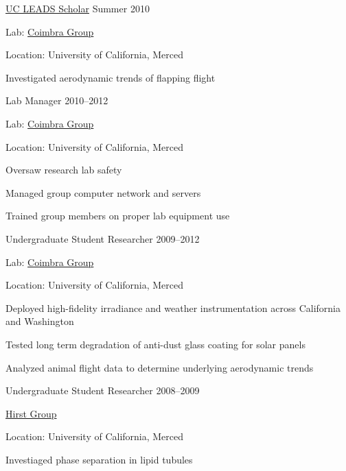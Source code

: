 \documentclass[11pt]{article}
\newcommand{\blankline}{\quad\pagebreak[3]}
\begin{document}
\blankline


\href{http://graduatedivision.ucmerced.edu/grad-prep-programs/uc-leads}{UC LEADS Scholar} \hfill Summer 2010
\begin{innerlist}
    \item Lab: \href{http://coimbra.ucsd.edu/}{Coimbra Group}
    \item Location: University of California, Merced
    \item Investigated aerodynamic trends of flapping flight
\end{innerlist}


\blankline


Lab Manager \hfill 2010--2012
\begin{innerlist}
    \item Lab: \href{http://coimbra.ucsd.edu/}{Coimbra Group}
    \item Location: University of California, Merced
    \item Oversaw research lab safety
    \item Managed group computer network and servers
    \item Trained group members on proper lab equipment use
\end{innerlist}


\blankline


Undergraduate Student Researcher \hfill 2009--2012
\begin{innerlist}
    \item Lab: \href{http://coimbra.ucsd.edu/}{Coimbra Group}
    \item Location: University of California, Merced
    \item Deployed high-fidelity irradiance and weather instrumentation across California and Washington
    \item Tested long term degradation of anti-dust glass coating for solar panels
    \item Analyzed animal flight data to determine underlying aerodynamic trends
\end{innerlist}


\blankline


Undergraduate Student Researcher \hfill 2008--2009 
\begin{innerlist}
    \item \href{http://faculty.ucmerced.edu/lhirst/}{Hirst Group}
    \item Location: University of California, Merced 
    \item Investiaged phase separation in lipid tubules
\end{innerlist}
\end{document}
